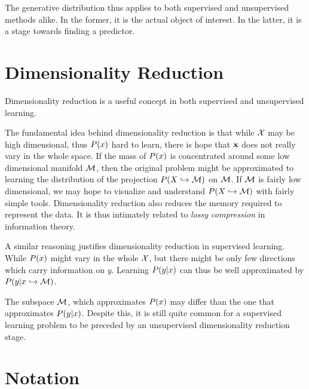 The generative distribution thus applies to both supervised and unsupervised methods alike.
In the former, it is the actual object of interest. In the latter, it is a stage towards finding a predictor. 






\chapter{Dimensionality Reduction}
\label{apx:dim_reduce}

Dimensionality reduction is a useful concept in both supervised and unsupervised learning. 

The fundamental idea behind dimensionality reduction is that while $\mathcal{X}$ may be high dimensional, thus $P(x)$ hard to learn, there is hope that $\mathbf{x}$ does not really vary in the whole space. 
If the mass of $P(x)$ is concentrated around some low dimensional manifold $\mathcal{M}$, then the original problem might be approximated to learning the distribution of the projection $P(X \hookrightarrow \mathcal{M})$ on $\mathcal{M}$. 
If $\mathcal{M}$ is fairly low dimensional, we may hope to visualize and understand $P(X \hookrightarrow \mathcal{M})$ with fairly simple tools.
Dimensionality reduction also reduces the memory required to represent the data. It is thus intimately related to \emph{lossy compression} in information theory.

A similar reasoning justifies dimensionality reduction in supervised learning. 
While $P(x)$ might vary in the whole $\mathcal{X}$, but there might be only few directions which carry information on $y$. Learning $P(y|x)$ can thus be well approximated by $P(y|x \hookrightarrow \mathcal{M})$.


\begin{remark}
The subspace $\mathcal{M}$, which approximates $P(x)$ may differ than the one that approximates $P(y|x)$. Despite this, it is still quite common for a supervised learning problem to be preceded by an unsupervised dimensionality reduction stage.
\end{remark}




\chapter{Notation}
\label{apx:notation}

